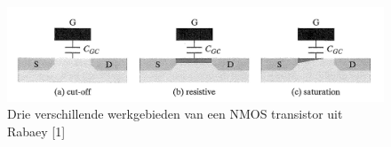  \begin{figure} [h!]
 \begin{center}
 \includegraphics [scale = 0.4] {figures/RABAEY_REGIONS}
 \caption{Drie verschillende werkgebieden van een NMOS transistor uit Rabaey [1]}
 \label{res:RABAEY_REGIONS}
 \end{center}
 \end{figure}





























